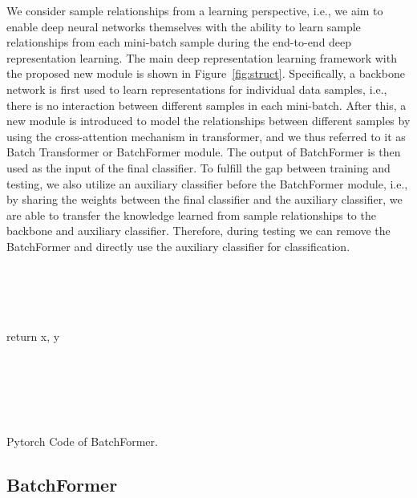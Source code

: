 \documentclass[10pt,twocolumn,letterpaper]{article}
\begin{document}
We consider sample relationships from a learning perspective, i.e., we aim to enable deep neural networks themselves with the ability to learn sample relationships from each mini-batch sample during the end-to-end deep representation learning. The main deep representation learning framework with the proposed new module is shown in Figure~\ref{fig:struct}. Specifically, a backbone network is first used to learn representations for individual data samples, i.e., there is no interaction between different samples in each mini-batch. After this, a new module is introduced to model the relationships between different samples by using the cross-attention mechanism in transformer, and we thus referred to it as Batch Transformer or BatchFormer module. The output of BatchFormer is then used as the input of the final classifier. To fulfill the gap between training and testing, we also utilize an auxiliary classifier before the BatchFormer module, i.e., by sharing the weights between the final classifier and the auxiliary classifier, we are able to transfer the knowledge learned from sample relationships to the backbone and auxiliary classifier. Therefore, during testing we can remove the BatchFormer and directly use the auxiliary classifier for classification.






\begin{algorithm}[!ht]
  \scriptsize
\SetAlFnt{\tiny}
\SetAlCapFnt{\small}
\SetAlCapNameFnt{\small}
\SetAlgoLined
{} \\
\Indp
{} \\
 \\
\\
    \Indp
    return x, y \\
    \Indm
{} \\
 \\
 \\
 \\
 \\
\Indm \caption{Pytorch Code of BatchFormer.}
\label{alg}
\end{algorithm}


\subsection{BatchFormer}
\end{document}
